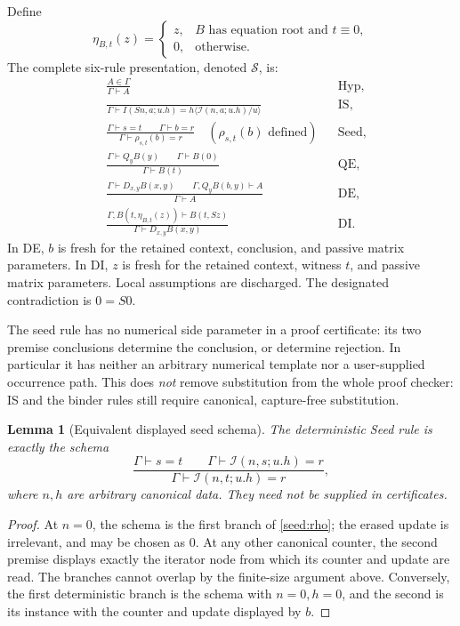\documentclass[11pt,a4paper]{article}
\newtheorem{lemma}[theorem]{Lemma}
\theoremstyle{definition}
\begin{document}
Define
\[
 \eta_{B,t}(z)=
 \begin{cases}
 z,&B\text{ has equation root and }t\equiv0,\\
 0,&\text{otherwise}.
 \end{cases}
\]
The complete six-rule presentation, denoted $\mathcal S$, is:
\begin{align*}
 &\frac{A\in\Gamma}{\Gamma\vdash A}
 &&\text{Hyp},\\[3pt]
 &\frac{}{\Gamma\vdash
 I(Sn,a;u.h)=h\langle\mathcal I(n,a;u.h)/u\rangle}
 &&\text{IS},\\[3pt]
 &\frac{\Gamma\vdash s=t\qquad\Gamma\vdash b=r}
 {\Gamma\vdash \rho_{s,t}(b)=r}
 \quad(\rho_{s,t}(b)\text{ defined})
 &&\text{Seed},\\[3pt]
 &\frac{\Gamma\vdash Q_yB(y)\qquad\Gamma\vdash B(0)}
 {\Gamma\vdash B(t)}
 &&\text{QE},\\[3pt]
 &\frac{\Gamma\vdash D_{x,y}B(x,y)\qquad
 \Gamma,Q_yB(b,y)\vdash A}{\Gamma\vdash A}
 &&\text{DE},\\[3pt]
 &\frac{\Gamma,B(t,\eta_{B,t}(z))\vdash B(t,Sz)}
 {\Gamma\vdash D_{x,y}B(x,y)}
 &&\text{DI}.
\end{align*}
In DE, $b$ is fresh for the retained context, conclusion, and passive
matrix parameters. In DI, $z$ is fresh for the retained context, witness
$t$, and passive matrix parameters. Local assumptions are discharged.
The designated contradiction is $0=S0$.

The seed rule has no numerical side parameter in a proof certificate:
its two premise conclusions determine the conclusion, or determine
rejection. In particular it has neither an arbitrary numerical template
nor a user-supplied occurrence path. This does \emph{not} remove
substitution from the whole proof checker: IS and the binder rules still
require canonical, capture-free substitution.

\begin{lemma}[Equivalent displayed seed schema]\label{seed:schema}
The deterministic Seed rule is exactly the schema
\[
 \frac{\Gamma\vdash s=t\qquad
 \Gamma\vdash\mathcal I(n,s;u.h)=r}
 {\Gamma\vdash \mathcal I(n,t;u.h)=r},
 \tag{K}\label{seed:K}
\]
where $n,h$ are arbitrary canonical data. They need not be supplied in
certificates.
\end{lemma}
\begin{proof}
At $n=0$, the schema is the first branch of
\eqref{seed:rho}; the erased update is irrelevant, and may be chosen as
$0$. At any other canonical counter, the second premise displays
exactly the iterator node from which its counter and update are read.
The branches cannot overlap by the finite-size argument above. Conversely,
the first deterministic branch is the schema with $n=0,h=0$, and the
second is its instance with the counter and update displayed by $b$.
\end{proof}
\end{document}
